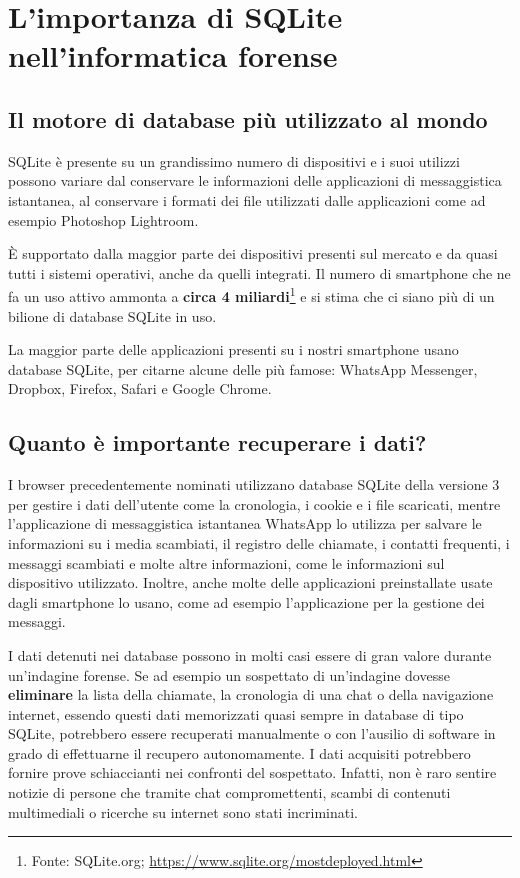 
\chapter{L’importanza di SQLite nell’informatica forense}


\section{Il motore di database più utilizzato al mondo}
SQLite è presente su un grandissimo numero di dispositivi e i suoi utilizzi possono variare dal conservare le informazioni delle applicazioni di messaggistica istantanea, al conservare i formati dei file utilizzati dalle applicazioni come ad esempio Photoshop Lightroom.

È supportato dalla maggior parte dei dispositivi presenti sul mercato e da quasi tutti i sistemi operativi, anche da quelli integrati. Il numero di smartphone che ne fa un uso attivo ammonta a \textbf{circa 4 miliardi}\footnote{Fonte: SQLite.org; \url{https://www.sqlite.org/mostdeployed.html}} e si stima che ci siano più di un bilione di database SQLite in uso.

La maggior parte delle applicazioni presenti su i nostri smartphone usano database SQLite, per citarne alcune delle più famose: WhatsApp Messenger, Dropbox, Firefox, Safari e Google Chrome.
 	

\section{Quanto è importante recuperare i dati?}
I browser precedentemente nominati utilizzano database SQLite della versione 3 per gestire i dati dell’utente come la cronologia, i cookie e i file scaricati, mentre l’applicazione di messaggistica istantanea WhatsApp lo utilizza per salvare le informazioni su i media scambiati, il registro delle chiamate, i contatti frequenti, i messaggi scambiati e molte altre informazioni, come le informazioni sul dispositivo utilizzato.
Inoltre, anche molte delle applicazioni preinstallate usate dagli smartphone lo usano, come ad esempio l’applicazione per la gestione dei messaggi.

\medskip

I dati detenuti nei database possono in molti casi essere di gran valore durante un’indagine forense.
Se ad esempio un sospettato di un’indagine dovesse \textbf{eliminare} la lista della chiamate, la cronologia di una chat o della navigazione internet, essendo questi dati memorizzati quasi sempre in database di tipo SQLite, potrebbero essere recuperati manualmente o con l’ausilio di software in grado di effettuarne il recupero autonomamente.
I dati acquisiti potrebbero fornire prove schiaccianti nei confronti del sospettato. Infatti, non è raro sentire notizie di persone che tramite chat compromettenti, scambi di contenuti multimediali o ricerche su internet sono stati incriminati.
